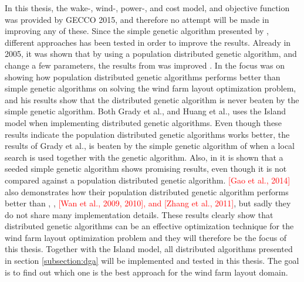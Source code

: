 \noindent In this thesis, the wake-, wind-, power-, and cost model, and objective function was provided by GECCO 2015, and therefore no attempt will be made in improving any of these. Since the simple genetic algorithm presented by \citep{Mosetti}, different approaches has been tested in order to improve the results. Already in 2005, it was shown that by using a population distributed genetic algorithm, and change a few parameters, the results from \citep{Mosetti} was improved \citep{Grady}. In \citep{Huang} the focus was on showing how population distributed genetic algorithms performs better than simple genetic algorithms on solving the wind farm layout optimization problem, and his results show that the distributed genetic algorithm is never beaten by the simple genetic algorithm. Both Grady et al., and Huang et al., uses the Island model when implementing distributed genetic algorithms. Even though these results indicate the population distributed genetic algorithms works better, the results of Grady et al., is beaten by the simple genetic algorithm of \cite{Gonzales} when a local search is used together with the genetic algorithm. Also, in \citep{Saavedra-Morena} it is shown that a seeded simple genetic algorithm shows promising results, even though it is not compared against a population distributed genetic algorithm. \textcolor{red}{[Gao et al., 2014]} also demonstrates how their population distributed genetic algorithm performs better than \citep{Mosetti}, \citep{Grady}, \citep{Gonzalez} \textcolor{red}{[Wan et al., 2009, 2010], and [Zhang et al., 2011]}, but sadly they do not share many implementation details. These results clearly show that distributed genetic algorithms can be an effective optimization technique for the wind farm layout optimization problem and they will therefore be the focus of this thesis. Together with the Island model, all distributed algorithms presented in section \ref{subsection:dga} will be implemented and tested in this thesis. The goal is to find out which one is the best approach for the wind farm layout domain. \\


